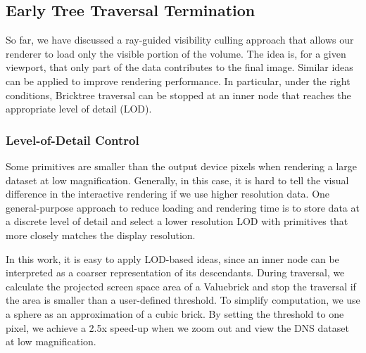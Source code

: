 \subsection{Early Tree Traversal Termination}
So far, we have discussed a ray-guided visibility culling approach that allows our renderer
to load only the visible portion of the volume. The idea is, for a given viewport, that only part of the data
contributes to the final image. Similar ideas can be applied to improve 
rendering performance. In particular, under the right conditions, Bricktree traversal
can be stopped at an inner node that reaches the appropriate level of detail (LOD). 

\subsubsection{Level-of-Detail Control}
Some primitives are smaller than the output device pixels when rendering a
large dataset at low magnification\cite{rusinkiewicz2000qsplat}. Generally, in this case,
it is hard to tell the visual difference in the interactive rendering if we use higher
resolution data. 
One general-purpose approach to reduce loading and rendering time is to store data at a discrete
level of detail and select a lower resolution LOD with primitives that more closely matches the
display resolution. 

In this work, it is easy to apply LOD-based ideas, since an inner node can be interpreted as
a coarser representation of its descendants. During traversal, we calculate the projected
screen space area of a Valuebrick and stop the traversal if the area is smaller than a 
user-defined threshold. To simplify computation, we use a sphere as an approximation of a cubic
brick. By setting the threshold to one pixel, we achieve a 2.5x speed-up when we 
zoom out and view the DNS dataset at low magnification. 


